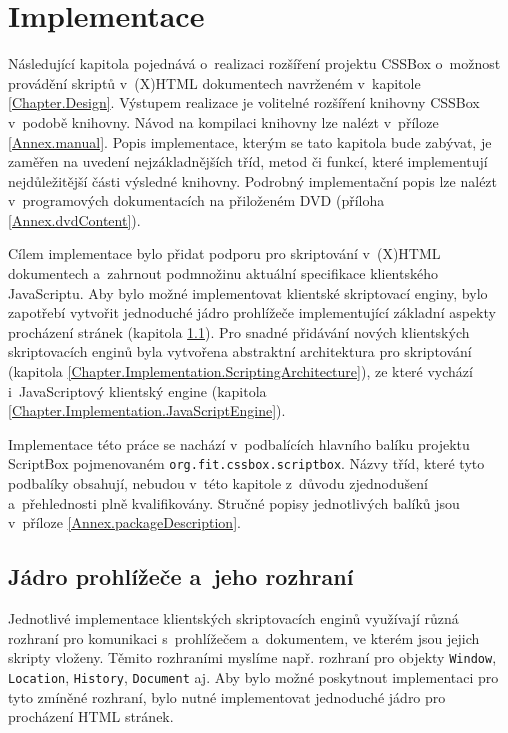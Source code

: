 \chapter{Implementace}
\label{Chapter.Implementation}

Následující kapitola pojednává o~realizaci rozšíření projektu CSSBox o~možnost provádění skriptů v~(X)HTML dokumentech navrženém v~kapitole \ref{Chapter.Design}. Výstupem realizace je volitelné rozšíření knihovny CSSBox v~podobě knihovny. Návod na kompilaci knihovny lze nalézt v~příloze \ref{Annex.manual}. Popis implementace, kterým se tato kapitola bude zabývat, je zaměřen na uvedení nejzákladnějších tříd, metod či funkcí, které implementují nejdůležitější části výsledné knihovny. Podrobný implementační popis lze nalézt v~programových dokumentacích na přiloženém DVD (příloha \ref{Annex.dvdContent}).

Cílem implementace bylo přidat podporu pro skriptování v~(X)HTML dokumentech a~zahrnout podmnožinu aktuální specifikace klientského JavaScriptu. Aby bylo možné implementovat klientské skriptovací enginy, bylo zapotřebí vytvořit jednoduché jádro prohlížeče implementující základní aspekty procházení stránek (kapitola \ref{Chapter.Implementation.BrowsingCore}). Pro snadné přidávání nových klientských skriptovacích enginů byla vytvořena abstraktní architektura pro skriptování (kapitola \ref{Chapter.Implementation.ScriptingArchitecture}), ze které vychází i~JavaScriptový klientský engine (kapitola \ref{Chapter.Implementation.JavaScriptEngine}).

Implementace této práce se nachází v~podbalících hlavního balíku projektu ScriptBox pojmenovaném \texttt{org.fit.cssbox.scriptbox}.  Názvy tříd, které tyto podbalíky obsahují, nebudou v~této kapitole z~důvodu zjednodušení a~přehlednosti plně kvalifikovány. Stručné popisy jednotlivých balíků jsou v~příloze \ref{Annex.packageDescription}.

\vspace{-0.5em}

\section{Jádro prohlížeče a~jeho rozhraní}
\label{Chapter.Implementation.BrowsingCore}

Jednotlivé implementace klientských skriptovacích enginů využívají různá rozhraní pro komunikaci s~prohlížečem a~dokumentem, ve kterém jsou jejich skripty vloženy. Těmito rozhraními myslíme např. rozhraní pro objekty \texttt{Window}, \texttt{Location}, \texttt{History}, \texttt{Document} aj. Aby bylo možné poskytnout implementaci pro tyto zmíněné rozhraní, bylo nutné implementovat jednoduché jádro pro procházení HTML stránek.

